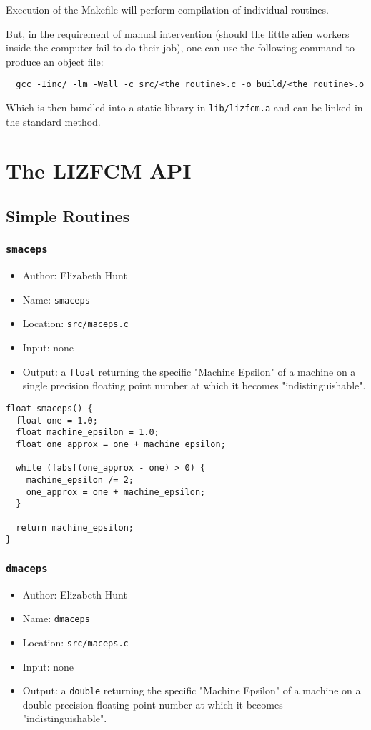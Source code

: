 \documentclass[11pt]{article}
\begin{document}
Execution of the Makefile will perform compilation of individual routines.

But, in the requirement of manual intervention (should the little alien workers
inside the computer fail to do their job), one can use the following command to
produce an object file:

\begin{verbatim}
  gcc -Iinc/ -lm -Wall -c src/<the_routine>.c -o build/<the_routine>.o
\end{verbatim}

Which is then bundled into a static library in \texttt{lib/lizfcm.a} and can be linked
in the standard method.

\section{The LIZFCM API}
\label{sec:org1ebe7fa}
\subsection{Simple Routines}
\label{sec:orgff18c6b}
\subsubsection{\texttt{smaceps}}
\label{sec:org443df5e}
\begin{itemize}
\item Author: Elizabeth Hunt
\item Name: \texttt{smaceps}
\item Location: \texttt{src/maceps.c}
\item Input: none
\item Output: a \texttt{float} returning the specific "Machine Epsilon" of a machine on a
single precision floating point number at which it becomes "indistinguishable".
\end{itemize}

\begin{verbatim}
float smaceps() {
  float one = 1.0;
  float machine_epsilon = 1.0;
  float one_approx = one + machine_epsilon;

  while (fabsf(one_approx - one) > 0) {
    machine_epsilon /= 2;
    one_approx = one + machine_epsilon;
  }

  return machine_epsilon;
}
\end{verbatim}

\subsubsection{\texttt{dmaceps}}
\label{sec:org5121603}
\begin{itemize}
\item Author: Elizabeth Hunt
\item Name: \texttt{dmaceps}
\item Location: \texttt{src/maceps.c}
\item Input: none
\item Output: a \texttt{double} returning the specific "Machine Epsilon" of a machine on a
double precision floating point number at which it becomes "indistinguishable".
\end{itemize}
\end{document}
